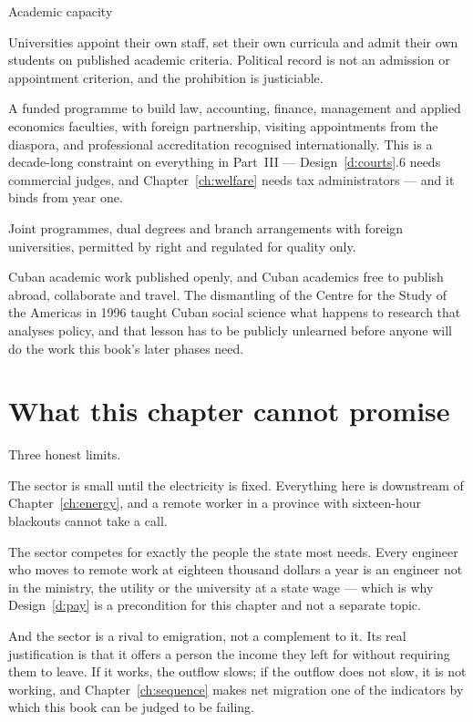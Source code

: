 \begin{design}{Academic capacity}
\label{d:university}
\begin{rules}
 Universities appoint their own staff, set their own curricula
and admit their own students on published academic criteria. Political record is
not an admission or appointment criterion, and the prohibition is justiciable.

 A funded programme to build law, accounting,
finance, management and applied economics faculties, with foreign partnership,
visiting appointments from the diaspora, and professional accreditation
recognised internationally. This is a decade-long constraint on everything in
Part~III --- Design~\ref{d:courts}.6 needs commercial judges, and
Chapter~\ref{ch:welfare} needs tax administrators --- and it binds from year one.

 Joint programmes, dual degrees and branch
arrangements with foreign universities, permitted by right and regulated for
quality only.

 Cuban academic work published openly, and Cuban
academics free to publish abroad, collaborate and travel. The dismantling of the
Centre for the Study of the Americas in 1996 taught Cuban social science what
happens to research that analyses policy, and that lesson has to be publicly
unlearned before anyone will do the work this book's later phases need.
\end{rules}
\end{design}

\section{What this chapter cannot promise}

Three honest limits.

The sector is small until the electricity is fixed. Everything here is downstream
of Chapter~\ref{ch:energy}, and a remote worker in a province with sixteen-hour
blackouts cannot take a call.

The sector competes for exactly the people the state most needs. Every engineer
who moves to remote work at eighteen thousand dollars a year is an engineer not
in the ministry, the utility or the university at a state wage --- which is why
Design~\ref{d:pay} is a precondition for this chapter and not a separate topic.

And the sector is a rival to emigration, not a complement to it. Its real
justification is that it offers a person the income they left for without
requiring them to leave. If it works, the outflow slows; if the outflow does not
slow, it is not working, and Chapter~\ref{ch:sequence} makes net migration one of
the indicators by which this book can be judged to be failing.
